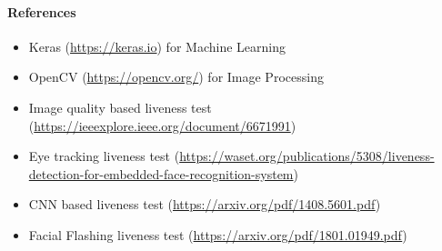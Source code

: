 \documentclass{article}
\begin{document}
    \paragraph{References}
        \begin{itemize}
            \item Keras (\url{https://keras.io}) for Machine Learning
            \item OpenCV (\url{https://opencv.org/}) for Image Processing
            \item Image quality based liveness test (\url{https://ieeexplore.ieee.org/document/6671991})
            \item Eye tracking liveness test (\url{https://waset.org/publications/5308/liveness-detection-for-embedded-face-recognition-system})
            \item CNN based liveness test (\url{https://arxiv.org/pdf/1408.5601.pdf})
            \item Facial Flashing liveness test (\url{https://arxiv.org/pdf/1801.01949.pdf})
        \end{itemize}
   
\end{document}

